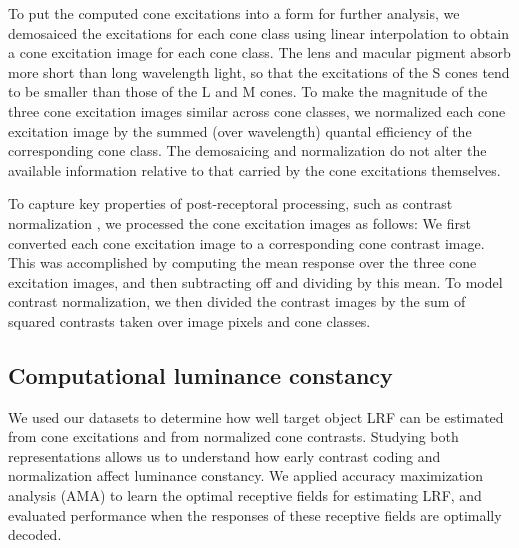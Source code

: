 \documentclass{jov}
\providecommand{\DIFdelend}{} %
\DeclareRobustCommand{\DIFdelend}{\DIFOaddend \let\includegraphics\DIFOincludegraphics} %
\begin{document}
\DIFdelend To put the computed cone excitations into a form for further analysis, we demosaiced the excitations for each cone class using linear interpolation
to obtain a cone excitation image for each cone class.
The lens and macular pigment absorb more short than long wavelength light, so that the excitations of the S cones tend to be
smaller than those of the L and M cones.
To make the magnitude of the three cone excitation images similar across cone classes, we
normalized each cone excitation image by the summed (over wavelength) quantal efficiency of the corresponding cone class.
The demosaicing and normalization do not alter the available information relative to that carried by the cone excitations themselves. 

To capture key properties of post-receptoral processing, such as contrast normalization \cite{heeger1992normalization,albrecht1991motion,carandini2012normalization}, 
we processed the cone excitation images as follows:
We first converted each cone excitation image to a corresponding cone contrast image.
This was accomplished by computing the mean response over the three cone excitation images, and then subtracting off and dividing by this mean.
To model contrast normalization, we then divided the contrast images by the sum of squared contrasts taken over image pixels and cone classes.

\subsection{Computational luminance constancy} \label{method:SupervisedLearning}
We used our datasets to determine how well target object LRF can be estimated from cone excitations and from normalized cone contrasts.
Studying both representations allows us to understand how early contrast coding and normalization affect luminance constancy.
We applied accuracy maximization analysis (AMA) to learn the optimal receptive fields for estimating LRF,
and evaluated performance when the responses of these receptive fields are optimally decoded.
\end{document}
